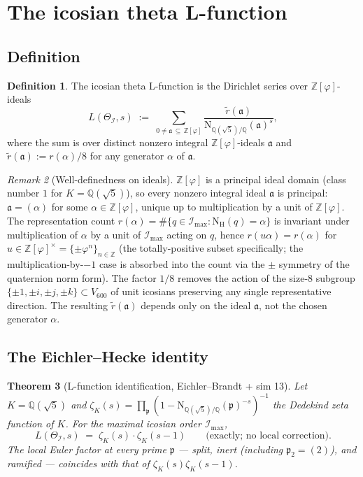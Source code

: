 \documentclass[11pt,a4paper]{article}
\newtheorem{theorem}{Theorem}
\theoremstyle{definition}
\newtheorem{definition}[theorem]{Definition}
\theoremstyle{remark}
\newtheorem{remark}[theorem]{Remark}
\newcommand{\Z}{\mathbb{Z}}
\newcommand{\Q}{\mathbb{Q}}
\newcommand{\II}{\mathcal{I}}
\newcommand{\IImax}{\mathcal{I}_{\mathrm{max}}}
\newcommand{\NH}{\mathrm{N}_{\mathrm{H}}}
\newcommand{\NQ}{\mathrm{N}_{\mathbb{Q}(\sqrt{5})/\mathbb{Q}}}
\newcommand{\Zphi}{\Z[\varphi]}
\begin{document}
\bigskip

\section{The icosian theta L-function}\label{sec:Lfunction}

\subsection{Definition}

\begin{definition}\label{def:LTheta}
The icosian theta L-function is the Dirichlet series over $\Zphi$-ideals
\[
  L(\Theta_\II, s) \;:=\; \sum_{0 \neq \mathfrak{a}\, \subseteq\, \Zphi}
  \frac{\widetilde r(\mathfrak{a})}{\NQ(\mathfrak{a})^{s}},
\]
where the sum is over distinct nonzero integral $\Zphi$-ideals
$\mathfrak{a}$ and $\widetilde r(\mathfrak{a}) := r(\alpha) / 8$ for any
generator $\alpha$ of $\mathfrak{a}$.
\end{definition}

\begin{remark}[Well-definedness on ideals]\label{rem:well-defined}
$\Zphi$ is a principal ideal domain (class number $1$ for $K =
\Q(\sqrt 5)$), so every nonzero integral ideal $\mathfrak{a}$ is
principal: $\mathfrak{a} = (\alpha)$ for some $\alpha \in \Zphi$, unique
up to multiplication by a unit of $\Zphi$. The representation count
$r(\alpha) = \#\{q \in \IImax : \NH(q) = \alpha\}$ is invariant under
multiplication of $\alpha$ by a unit of $\IImax$ acting on $q$, hence
$r(u\alpha) = r(\alpha)$ for $u \in \Zphi^\times = \{\pm \varphi^n\}_{n\in\Z}$
(the totally-positive subset specifically; the multiplication-by-$-1$
case is absorbed into the count via the $\pm$ symmetry of the
quaternion norm form). The factor $1/8$ removes the action of the
size-$8$ subgroup
$\{\pm 1, \pm i, \pm j, \pm k\} \subset V_{600}$ of unit icosians
preserving any single representative direction. The resulting
$\widetilde r(\mathfrak{a})$ depends only on the ideal $\mathfrak{a}$,
not the chosen generator $\alpha$.
\end{remark}

\subsection{The Eichler--Hecke identity}

\begin{theorem}[L-function identification, Eichler--Brandt + sim 13]\label{thm:euler-bridge}
Let $K = \Q(\sqrt 5)$ and $\zeta_K(s) = \prod_{\mathfrak{p}} (1 - \NQ(\mathfrak{p})^{-s})^{-1}$
the Dedekind zeta function of $K$. For the \emph{maximal} icosian order $\IImax$,
\[
  L(\Theta_\II, s) \;=\; \zeta_K(s)\!\cdot\! \zeta_K(s-1)
  \qquad\text{(exactly; no local correction).}
\]
The local Euler factor at \emph{every} prime $\mathfrak{p}$ --- split, inert
(including $\mathfrak{p}_2=(2)$), and ramified --- coincides with that of
$\zeta_K(s)\zeta_K(s-1)$.
\end{theorem}
\end{document}
